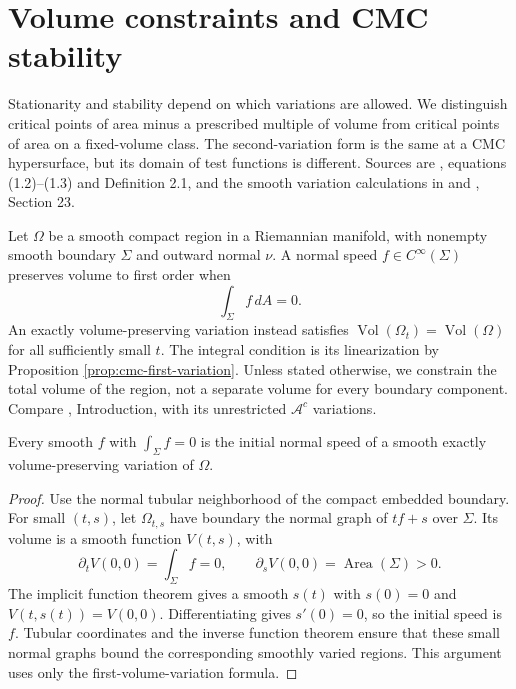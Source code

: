 \chapter{Volume constraints and CMC stability}\label{sec:cmc-stability}
Stationarity and stability depend on which variations are allowed. We distinguish critical points of area minus a prescribed multiple of volume from critical points of area on a fixed-volume class. The second-variation form is the same at a CMC hypersurface, but its domain of test functions is different. Sources are \cite{ZZCMC}, equations (1.2)--(1.3) and Definition 2.1, and the smooth variation calculations in \cite{HP99} and \cite{ChMin}, Section 23.

\begin{definition}\label{def:volume-preserving-speed}
Let $\Omega$ be a smooth compact region in a Riemannian manifold, with nonempty smooth boundary $\Sigma$ and outward normal $\nu$. A normal speed $f\in C^\infty(\Sigma)$ preserves volume to first order when
\[
 \int_\Sigma f\,dA=0.
\]
An exactly volume-preserving variation instead satisfies $\operatorname{Vol}(\Omega_t)=\operatorname{Vol}(\Omega)$ for all sufficiently small $t$. The integral condition is its linearization by Proposition \ref{prop:cmc-first-variation}. Unless stated otherwise, we constrain the total volume of the region, not a separate volume for every boundary component. Compare \cite{ZZCMC}, Introduction, with its unrestricted $\mathcal A^c$ variations.
\end{definition}

\begin{proposition}\label{prop:realize-volume-constraint}
Every smooth $f$ with $\int_\Sigma f=0$ is the initial normal speed of a smooth exactly volume-preserving variation of $\Omega$.
\end{proposition}
\begin{proof}
Use the normal tubular neighborhood of the compact embedded boundary. For small $(t,s)$, let $\Omega_{t,s}$ have boundary the normal graph of $tf+s$ over $\Sigma$. Its volume is a smooth function $V(t,s)$, with
\[
 \partial_tV(0,0)=\int_\Sigma f=0,\qquad
 \partial_sV(0,0)=\operatorname{Area}(\Sigma)>0.
\]
The implicit function theorem gives a smooth $s(t)$ with $s(0)=0$ and $V(t,s(t))=V(0,0)$. Differentiating gives $s'(0)=0$, so the initial speed is $f$. Tubular coordinates and the inverse function theorem ensure that these small normal graphs bound the corresponding smoothly varied regions. This argument uses only the first-volume-variation formula.
\end{proof}

